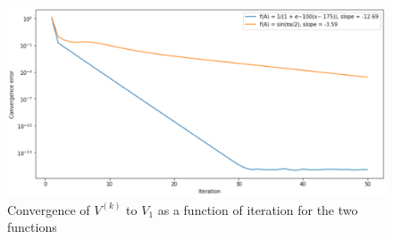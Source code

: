 \documentclass[11pt,onecolumn]{article}
\begin{document}
\begin{figure}
    \centering
    \includegraphics[totalheight=8cm]{func_convergence.png}
    \caption{Convergence of \( V^{(k)} \) to \( V_1 \) as a function of iteration for the two functions}
    \label{fig:verticalcell}
\end{figure}
\end{document}
